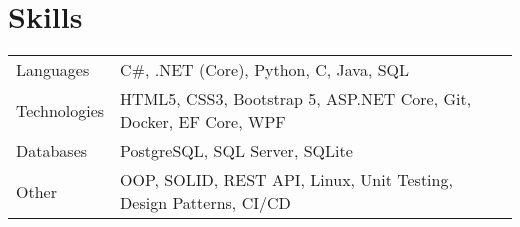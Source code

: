 \documentclass[a4paper,12pt]{article}
\begin{document}
\section{Skills}
\begin{tabularx}{\linewidth}{@{}l X@{}}
Languages &  \normalsize{C\#, .NET (Core), Python, C, Java, SQL  }\\
Technologies &  \normalsize{HTML5, CSS3, Bootstrap 5, ASP.NET Core, Git, Docker, EF Core, WPF }\\
Databases &  \normalsize{PostgreSQL, SQL Server, SQLite  }\\
Other &  \normalsize{ OOP, SOLID, REST API, Linux, Unit Testing, Design Patterns, CI/CD }\\
\end{tabularx}





\end{document}
